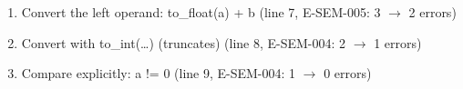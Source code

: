 \begin{enumerate}[nosep]
\item Convert the left operand: to\_float(a) + b (line 7, E-SEM-005: 3 $\rightarrow$ 2 errors)
\item Convert with to\_int(\ldots{}) (truncates) (line 8, E-SEM-004: 2 $\rightarrow$ 1 errors)
\item Compare explicitly: a != 0 (line 9, E-SEM-004: 1 $\rightarrow$ 0 errors)
\end{enumerate}
